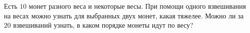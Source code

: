 \documentclass{article}
\begin{document}
Есть $10$ монет разного веса и некоторые весы. При помощи одного взвешивания на весах можно узнать для выбранных двух монет, какая тяжелее. 
Можно ли за $20$ взвешиваний узнать, в каком порядке монеты идут по весу?
\end{document}
